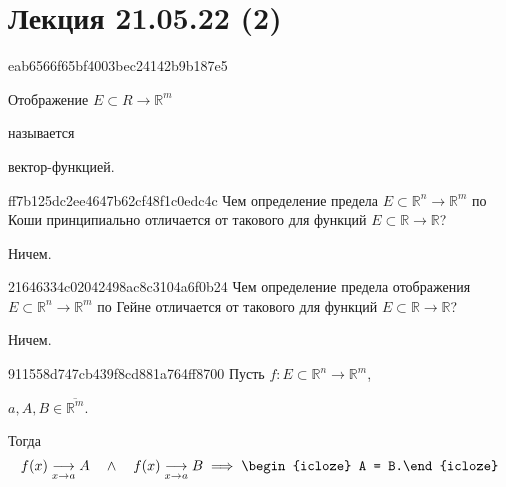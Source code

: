 \section{Лекция 21.05.22 (2)}
\begin{note}{eab6566f65bf4003bec24142b9b187e5}
    \begin{icloze}{2}Отображение \({ E \subset R \to \mathbb R^{m} }\)\end{icloze} называется \begin{icloze}{1}вектор-фун\-кци\-ей.\end{icloze}
\end{note}

\begin{note}{ff7b125dc2ee4647b62cf48f1c0edc4c}
    Чем определение предела \({ E \subset \mathbb R^{n} \to \mathbb R^{m} }\) по Коши принципиально отличается от такового для функций \({ E \subset \mathbb R \to \mathbb R }\)?

    \begin{cloze}{1}
        Ничем.
    \end{cloze}
\end{note}

\begin{note}{21646334c02042498ac8c3104a6f0b24}
    Чем определение предела отображения \({ E \subset \mathbb R^{n} \to \mathbb R^{m} }\) по Гейне отличается от такового для функций \({ E \subset \mathbb R \to \mathbb R }\)?

    \begin{cloze}{1}
        Ничем.
    \end{cloze}
\end{note}

\begin{note}{911558d747cb439f8cd881a764ff8700}
    Пусть \({ f : E \subset \mathbb R^{n} \to \mathbb R^{m} }\),\: \begin{icloze}{2}\({ a, A, B \in \overline{\mathbb R^{m}} }\).\end{icloze}
    Тогда
    \[
        f(x) \underset{x \to a}\longrightarrow A \quad \land \quad f(x) \underset{x \to a}\longrightarrow B \implies \begin{icloze}{1}A = B.\end{icloze}
    \]
\end{note}

